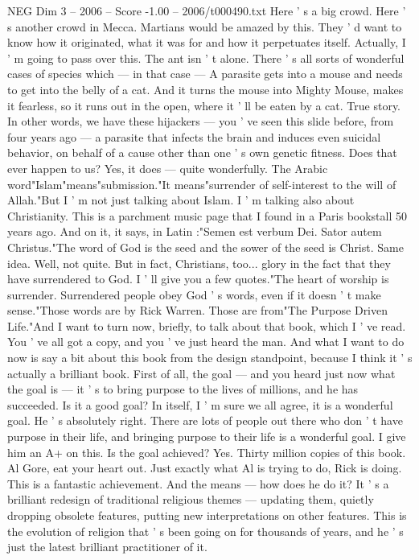 \begin{textsample}{NEG Dim 3 – 2006 – Score -1.00 – 2006/t000490.txt}
Here ' s a big crowd.
Here ' s another crowd in Mecca.
Martians would be amazed by this.
They ' d want to know how it originated, what it was for and how it perpetuates itself.
Actually, I ' m going to pass over this.
The ant isn ' t alone.
There ' s all sorts of wonderful cases of species which — in that case — A parasite gets into a mouse and needs to get into the belly of a cat.
And it turns the mouse into Mighty Mouse, makes it fearless, so it runs out in the open, where it ' ll be eaten by a cat.
True story.
In other words, we have these hijackers — you ' ve seen this slide before, from four years ago — a parasite that infects the brain and induces even suicidal behavior, on behalf of a cause other than one ' s own genetic fitness.
Does that ever happen to us?
Yes, it does — quite wonderfully.
The Arabic word"Islam"means"submission."It means"surrender of self-interest to the will of Allah."But I ' m not just talking about Islam.
I ' m talking also about Christianity.
This is a parchment music page that I found in a Paris bookstall 50 years ago.
And on it, it says, in Latin :"Semen est verbum Dei.
Sator autem Christus."The word of God is the seed and the sower of the seed is Christ.
Same idea.
Well, not quite.
But in fact, Christians, too... glory in the fact that they have surrendered to God.
I ' ll give you a few quotes."The heart of worship is surrender.
Surrendered people obey God ' s words, even if it doesn ' t make sense."Those words are by Rick Warren.
Those are from"The Purpose Driven Life."And I want to turn now, briefly, to talk about that book, which I ' ve read.
You ' ve all got a copy, and you ' ve just heard the man.
And what I want to do now is say a bit about this book from the design standpoint, because I think it ' s actually a brilliant book.
First of all, the goal — and you heard just now what the goal is — it ' s to bring purpose to the lives of millions, and he has succeeded.
Is it a good goal?
In itself, I ' m sure we all agree, it is a wonderful goal.
He ' s absolutely right.
There are lots of people out there who don ' t have purpose in their life, and bringing purpose to their life is a wonderful goal.
I give him an A+ on this.
Is the goal achieved?
Yes.
Thirty million copies of this book.
Al Gore, eat your heart out.
Just exactly what Al is trying to do, Rick is doing.
This is a fantastic achievement.
And the means — how does he do it?
It ' s a brilliant redesign of traditional religious themes — updating them, quietly dropping obsolete features, putting new interpretations on other features.
This is the evolution of religion that ' s been going on for thousands of years, and he ' s just the latest brilliant practitioner of it.

\end{textsample}
